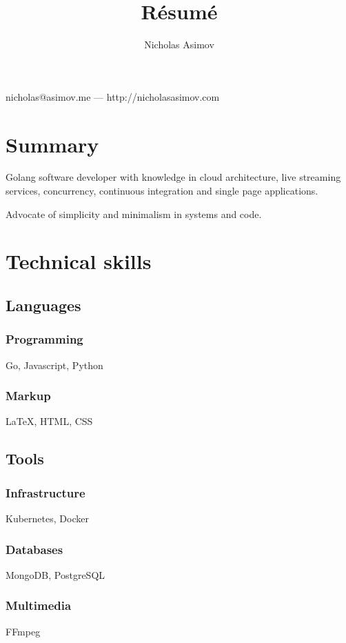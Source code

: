 \documentclass[a4paper,11pt]{article}
\makeatletter
\renewcommand{\maketitle}{
    \begin{center}
        {
            \huge
            \bfseries
            \theauthor
        }
 
        \vspace{.25em}
        nicholas@asimov.me --- http://nicholasasimov.com
    \end{center}
}
\makeatother
\begin{document}
\title{R\'esum\'e}
\author{Nicholas Asimov}

\maketitle

\section{Summary}

Golang software developer with knowledge in cloud architecture, live streaming services, concurrency,
continuous integration and single page applications.

Advocate of simplicity and minimalism in systems and code.

\section{Technical skills}

\subsection{Languages}

\subsubsection{Programming}
Go, Javascript, Python

\subsubsection{Markup}
{\LaTeX}, HTML, CSS


\subsection{Tools}

\subsubsection{Infrastructure}
Kubernetes, Docker

\subsubsection{Databases}
MongoDB, PostgreSQL

\subsubsection{Multimedia}
FFmpeg
\end{document}
